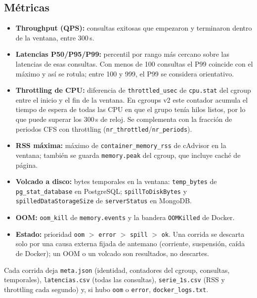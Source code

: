 \documentclass[11pt,a4paper]{article}
\newcommand{\cod}[1]{\texttt{#1}}
\begin{document}
\subsection{Métricas}
\begin{itemize}
\item \textbf{Throughput (QPS):} consultas exitosas que empezaron y terminaron dentro de
  la ventana, entre 300\,s.
\item \textbf{Latencias P50/P95/P99:} percentil por rango más cercano sobre las
  latencias de esas consultas. Con menos de 100 consultas el P99 coincide con el máximo y
  así se rotula; entre 100 y 999, el P99 se considera orientativo.
\item \textbf{Throttling de CPU:} diferencia de \cod{throttled\_usec} de
  \cod{cpu.stat} del cgroup entre el inicio y el fin de la ventana. En cgroups v2 este
  contador acumula el tiempo de espera de todas las CPU en que el grupo tenía hilos
  listos, por lo que puede superar los 300\,s de reloj. Se complementa con la fracción de
  periodos CFS con throttling (\cod{nr\_throttled}/\cod{nr\_periods}).
\item \textbf{RSS máxima:} máximo de \cod{container\_memory\_rss} de cAdvisor en la
  ventana; también se guarda \cod{memory.peak} del cgroup, que incluye caché de página.
\item \textbf{Volcado a disco:} bytes temporales en la ventana: \cod{temp\_bytes} de
  \cod{pg\_stat\_database} en PostgreSQL; \cod{spillToDiskBytes} y
  \cod{spilledDataStorageSize} de \cod{serverStatus} en MongoDB.
\item \textbf{OOM:} \cod{oom\_kill} de \cod{memory.events} y la bandera
  \cod{OOMKilled} de Docker.
\item \textbf{Estado:} prioridad \cod{oom} $>$ \cod{error} $>$ \cod{spill} $>$
  \cod{ok}. Una corrida se descarta solo por una causa externa fijada de antemano
  (corriente, suspensión, caída de Docker); un OOM o un volcado son resultados, no
  descartes.
\end{itemize}
Cada corrida deja \cod{meta.json} (identidad, contadores del cgroup, consultas, temporales),
\cod{latencias.csv} (todas las consultas), \cod{serie\_1s.csv} (RSS y throttling cada
segundo) y, si hubo \cod{oom} o \cod{error}, \cod{docker\_logs.txt}.
\end{document}

